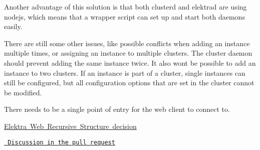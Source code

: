 Another advantage of this solution is that both clusterd and elektrad are using nodejs, which means that a wrapper script can set up and start both daemons easily.

There are still some other issues, like possible conflicts when adding an instance multiple times, or assigning an instance to multiple clusters. The cluster daemon should prevent adding the same instance twice. It also won\textquotesingle{}t be possible to add an instance to two clusters. If an instance is part of a cluster, single instances can still be configured, but all configuration options that are set in the cluster cannot be modified.


\begin{DoxyItemize}
\item There needs to be a single point of entry for the web client to connect to.
\end{DoxyItemize}


\begin{DoxyItemize}
\item \mbox{\hyperlink{doc_decisions_elektra_web_recursive_md}{Elektra Web Recursive Structure decision}}
\end{DoxyItemize}


\begin{DoxyItemize}
\item \href{https://github.com/ElektraInitiative/libelektra/pull/1173}{\texttt{ Discussion in the pull request}} 
\end{DoxyItemize}